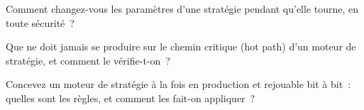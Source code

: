 \begin{interviewq}\label{iq:ll:the-strategy-engine:4}
Comment changez-vous les paramètres d'une stratégie pendant qu'elle tourne, en toute sécurité~?
\end{interviewq}

\begin{interviewq}\label{iq:ll:the-strategy-engine:5}
Que ne doit jamais se produire sur le chemin critique (hot path) d'un moteur de stratégie, et comment le vérifie-t-on~?
\end{interviewq}

\begin{interviewq}\label{iq:ll:the-strategy-engine:6}
Concevez un moteur de stratégie à la fois en production et rejouable bit à bit~: quelles sont les règles, et comment les fait-on appliquer~?
\end{interviewq}
